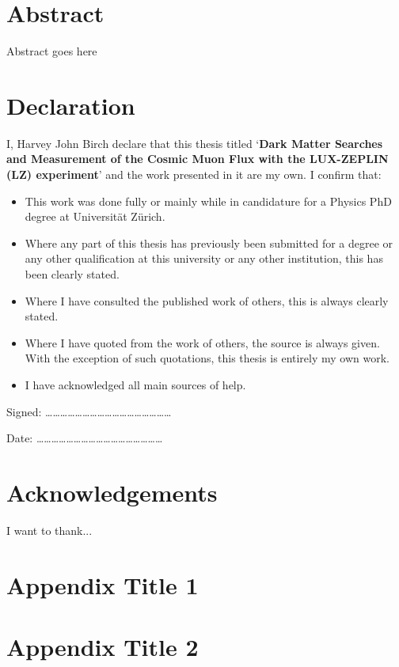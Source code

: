 \documentclass[a4paper,11pt,usegeometry]{scrreprt} %
\begin{document}
\chapter*{Abstract}
Abstract goes here


\newpage\null\thispagestyle{empty}\newpage

\chapter*{Declaration}
\vskip 1in
I, Harvey John Birch declare that this thesis titled ‘\textbf{Dark Matter Searches and Measurement of the Cosmic Muon Flux with the LUX-ZEPLIN (LZ) experiment}’ and the work presented in it are my own. I confirm that:
\bigbreak

\begin{itemize}
\item This work was done fully or mainly while in candidature for a Physics PhD degree at Universit\"at Z\"urich.
\item Where any part of this thesis has previously been submitted for a degree or any other qualification at this university or any other institution, this has been clearly stated.
\item Where I have consulted the published work of others, this is always clearly stated.
\item Where I have quoted from the work of others, the source is always given. With the exception of such quotations, this thesis is entirely my own work.
\item I have acknowledged all main sources of help.
\end{itemize}
\vskip 2in

Signed:
……………………………………………
\bigskip

Date:
……………………………………………

\newpage\null\thispagestyle{empty}\newpage

\chapter*{Acknowledgements}
I want to thank...

\tableofcontents
\listoffigures	%
\listoftables  %
\clearpage
{}








\printbibliography[heading=bibintoc,title={Bibliography}]
\appendix
\chapter{Appendix Title 1}

\chapter{Appendix Title 2}

\end{document}
